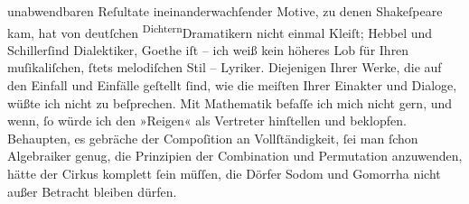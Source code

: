                unabwendbaren Reſultate ineinanderwachſender Motive, zu denen Shakeſpeare kam, hat von deutſchen \substVorne{}\textsuperscript{Dichtern}\substDazwischen{}Dramatikern\substHinten{} nicht einmal Kleiſt; Hebbel und Schillerſind Dialektiker, {\pb}Goethe iſt – ich weiß kein höheres Lob für
               Ihren muſikaliſchen, ſtets melodiſchen Stil – Lyriker. Diejenigen Ihrer Werke, die
               auf den Einfall und Einfälle geſtellt ſind, wie die meiſten Ihrer Einakter und
               Dialoge, wüßte ich nicht zu beſprechen. Mit Mathematik befaſſe ich mich nicht gern,
               und wenn, ſo würde ich den »Reigen« als
               Vertreter hinſtellen und beklopfen. Behaupten, es gebräche der Compoſition an
               Vollſtändigkeit, ſei man ſchon Algebraiker genug, die Prinzipien der Combination und
               Permutation anzuwenden, hätte der Cirkus komplett ſein müſſen, die Dörfer Sodom und
               Gomorrha nicht außer Betracht bleiben dürfen.\pend
           

